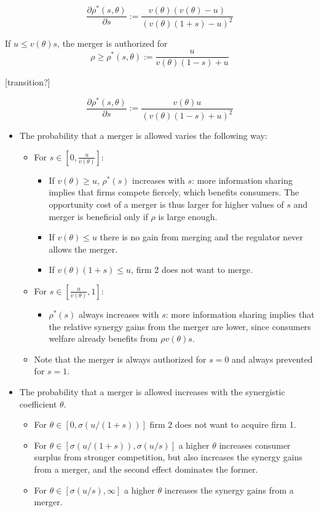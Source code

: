 \documentclass[a4paper,leqno]{article}%
\renewcommand{\t}{\theta}
\renewcommand{\t}{\theta}
\newcommand{\s}{\sigma}
\begin{document}
\[
\frac{\partial \rho^{*}(s,\t)}{\partial s}:=\frac{v(\t)(v(\t)-u)}{(v(\t)(1+s)-u)^2}
\]
    
If $u\leq v(\t)s$, the merger is authorized for 
    \begin{equation}
           \rho\geq \rho^*(s,\t):=\frac{u}{v(\t)(1-s)+u}
    \end{equation}

[transition?]

\[
    \frac{\partial \rho^{*}(s,\t)}{\partial s}:=\frac{v(\t)u}{(v(\t)(1-s)+u)^2}
\]


\begin{itemize}
    \item The probability that a merger is allowed varies the following way:
    \begin{itemize}
        \item For $s\in[0,\frac{u}{v(\t)}]$:
        \begin{itemize}
            \item If $v(\t)\geq u$, $\rho^*(s)$ increases with $s$: more information sharing implies that firms compete fiercely, which benefits consumers. The opportunity cost of a merger is thus larger for higher values of $s$ and merger is beneficial only if $\rho$ is large enough.
            \item If $v(\t)\leq u$ there is no gain from merging and the regulator never allows the merger.
            \item If $v(\t)(1+s)\leq u$, firm 2 does not want to merge.
        \end{itemize}
        \item For $s\in[\frac{u}{v(\t)},1]$:
        \begin{itemize}
            \item $\rho^*(s)$ always increases with $s$: more information sharing implies that the relative synergy gains from the merger are lower, since consumers welfare already benefits from $\rho v(\t)s$.
        \end{itemize}
        \item Note that the merger is always authorized for $s=0$ and always prevented for $s=1$.
    \end{itemize} 
    \item The probability that a merger is allowed increases with the synergistic coefficient $\t$. 
    \begin{itemize}
        \item For $\t\in[0,\s(u/(1+s))]$ firm 2 does not want to acquire firm 1.
        \item For $\t\in[\s(u/(1+s)),\s(u/s)]$ a higher $\t$ increases consumer surplus from stronger competition, but also increases the synergy gains from a merger, and the second effect dominates the former.
        \item For $\t\in[\s(u/s),\infty]$ a higher $\t$ increases the synergy gains from a merger.
    \end{itemize} 
\end{itemize}
\end{document}
